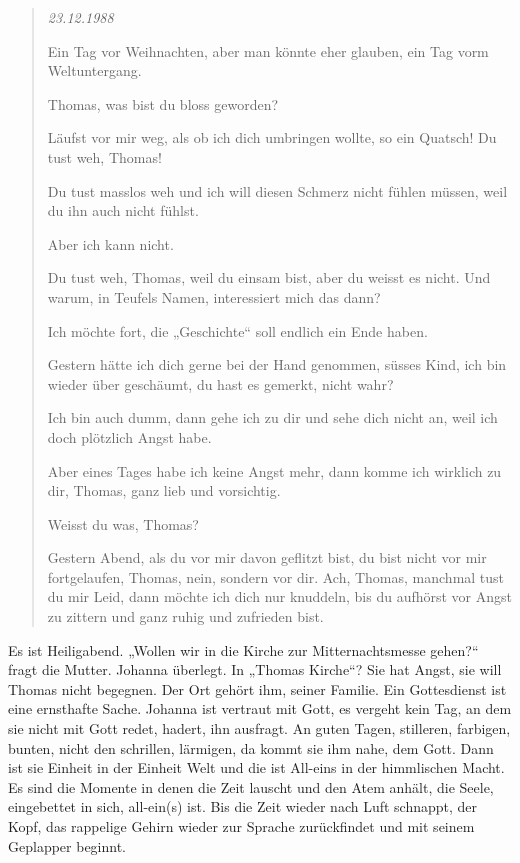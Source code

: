 \documentclass[10pt,titlepage,a5paper]{book}
\newenvironment{tg}{\begin{quote}\em}{\end{quote}}
\begin{document}
\begin{tg}
23.12.1988

Ein Tag vor Weihnachten, aber man könnte eher glauben, ein Tag vorm Weltuntergang.

Thomas, was bist du bloss geworden?

Läufst vor mir weg, als ob ich dich umbringen wollte, so ein Quatsch!
Du tust weh, Thomas!

Du tust masslos weh und ich will diesen Schmerz nicht fühlen müssen, weil du ihn auch nicht fühlst.

Aber ich kann nicht.

Du tust weh, Thomas, weil du einsam bist, aber du weisst es nicht. Und warum, in Teufels Namen, interessiert mich das dann?

Ich möchte fort, die „Geschichte“ soll endlich ein Ende haben.

Gestern hätte ich dich gerne bei der Hand genommen, süsses Kind, ich bin wieder über geschäumt, du hast es gemerkt, nicht wahr?

Ich bin auch dumm, dann gehe ich zu dir und sehe dich nicht an, weil ich doch plötzlich Angst habe.

Aber eines Tages habe ich keine Angst mehr, dann komme ich wirklich zu dir, Thomas, ganz lieb und vorsichtig.

Weisst du was, Thomas?

Gestern Abend, als du vor mir davon geflitzt bist, du bist nicht vor mir fortgelaufen, Thomas, nein, sondern vor dir. Ach, Thomas, manchmal tust du mir Leid, dann möchte ich dich nur knuddeln, bis du aufhörst vor Angst zu zittern und ganz ruhig und zufrieden bist.
\end{tg}


Es ist Heiligabend. „Wollen wir in die Kirche zur Mitternachtsmesse gehen?“ fragt die Mutter. Johanna überlegt. In „Thomas Kirche“? Sie hat Angst, sie will Thomas nicht begegnen. Der Ort gehört ihm, seiner Familie. 
Ein Gottesdienst ist eine ernsthafte Sache. Johanna ist vertraut mit Gott, es vergeht kein Tag, an dem sie nicht mit Gott redet, hadert, ihn ausfragt. An guten Tagen, stilleren, farbigen, bunten, nicht den schrillen, lärmigen, da kommt sie ihm nahe, dem Gott. Dann ist sie Einheit in der Einheit Welt und die ist All-eins in der himmlischen Macht. Es sind die Momente in denen die Zeit lauscht und den Atem anhält, die Seele, eingebettet in sich, all-ein(s) ist. Bis die Zeit wieder nach Luft schnappt, der Kopf, das rappelige Gehirn wieder zur Sprache zurückfindet und mit seinem Geplapper beginnt.
\end{document}
